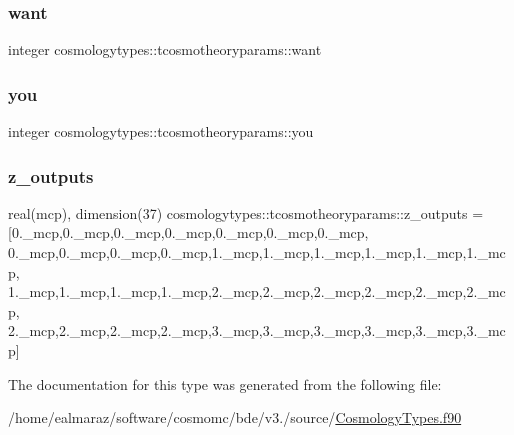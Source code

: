 \subsubsection{\texorpdfstring{want}{want}}
{\footnotesize\ttfamily integer cosmologytypes\+::tcosmotheoryparams\+::want}

\mbox{\label{structcosmologytypes_1_1tcosmotheoryparams_abf269d4103d41e9c6703704eabadf596}} 
\subsubsection{\texorpdfstring{you}{you}}
{\footnotesize\ttfamily integer cosmologytypes\+::tcosmotheoryparams\+::you}

\mbox{\label{structcosmologytypes_1_1tcosmotheoryparams_a22a82ebc1208015f9370befe9946024f}} 
\subsubsection{\texorpdfstring{z\+\_\+outputs}{z\_outputs}}
{\footnotesize\ttfamily real(mcp), dimension(37) cosmologytypes\+::tcosmotheoryparams\+::z\+\_\+outputs = \mbox{[}0.\+\_\+mcp,0.\+\_\+mcp,0.\+\_\+mcp,0.\+\_\+mcp,0.\+\_\+mcp,0.\+\_\+mcp,0.\+\_\+mcp, 0.\+\_\+mcp,0.\+\_\+mcp,0.\+\_\+mcp,0.\+\_\+mcp,1.\+\_\+mcp,1.\+\_\+mcp,1.\+\_\+mcp,1.\+\_\+mcp,1.\+\_\+mcp,1.\+\_\+mcp, 1.\+\_\+mcp,1.\+\_\+mcp,1.\+\_\+mcp,1.\+\_\+mcp,2.\+\_\+mcp,2.\+\_\+mcp,2.\+\_\+mcp,2.\+\_\+mcp,2.\+\_\+mcp,2.\+\_\+mcp, 2.\+\_\+mcp,2.\+\_\+mcp,2.\+\_\+mcp,2.\+\_\+mcp,3.\+\_\+mcp,3.\+\_\+mcp,3.\+\_\+mcp,3.\+\_\+mcp,3.\+\_\+mcp,3.\+\_\+mcp\mbox{]}}



The documentation for this type was generated from the following file\+:\begin{DoxyCompactItemize}
\item 
/home/ealmaraz/software/cosmomc/bde/v3./source/\mbox{\hyperlink{CosmologyTypes_8f90}{Cosmology\+Types.\+f90}}\end{DoxyCompactItemize}

